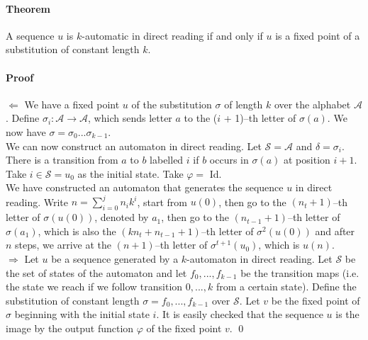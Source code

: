 \documentclass{article}
\begin{document}
\paragraph{Theorem} A sequence $u$ is $k$-automatic in direct reading if and
only if $u$ is a fixed point of a substitution of constant length $k$.

\paragraph{Proof}
$\Leftarrow$ We have a fixed point $u$ of the substitution $\sigma$ of length
$k$ over the alphabet $\mathcal{A}$. Define
$\sigma_i: \mathcal{A} \rightarrow \mathcal{A}$, which sends letter $a$ to the
($i$ + 1)--th letter of $\sigma(a)$. We now have
$\sigma = \sigma_0 ... \sigma_{k - 1}$.\\
We can now construct an automaton in direct reading. Let $\mathcal{S = A}$ and
$\delta = \sigma_i$. There is a transition from $a$ to $b$ labelled $i$ if $b$
occurs in $\sigma(a)$ at position $i + 1$. Take $i \in \mathcal{S} = u_0$ as
the initial state. Take $\varphi =$ Id.\\
We have constructed an automaton that generates the sequence $u$ in direct
reading. Write $n = \sum_{i = 0}^j n_i k^i$, start from $u(0)$, then go to the
$(n_t + 1)$--th letter of $\sigma(u(0))$, denoted by $a_1$, then go to the
$(n_{t - 1} + 1)$--th letter of $\sigma(a_1)$, which is also the
$(kn_t + n_{t - 1} + 1)$--th letter of $\sigma^2(u(0))$ and after $n$ steps, we
arrive at the $(n + 1)$--th letter of $\sigma^{t + 1}(u_0)$, which is $u(n)$.\\
$\Rightarrow$ Let $u$ be a sequence generated by a $k$-automaton in direct
reading. Let $\mathcal{S}$ be the set of states of the automaton and let
$f_0, ..., f_{k - 1}$ be the transition maps (i.e. the state we reach if we
follow transition $0, ..., k$ from a certain state). Define the substitution of
constant length $\sigma = f_0, ..., f_{k - 1}$ over $\mathcal{S}$. Let $v$ be
the fixed point of $\sigma$ beginning with the initial state $i$. It is easily
checked that the sequence $u$ is the image by the output function $\varphi$ of
the fixed point $v$. \qed
\end{document}
